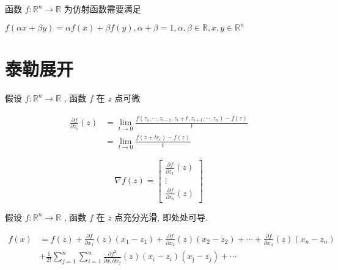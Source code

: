 \begin{theorem}
    函数 $ f: \mathbb{R}^{n} \rightarrow \mathbb{R} $ 为仿射函数需要满足

$ f(\alpha x+\beta y)=\alpha f(x)+\beta f(y), \alpha+\beta=1, \alpha, \beta \in \mathbb{R}, x, y \in \mathbb{R}^{n} $
\end{theorem}

\section{泰勒展开}

\begin{definition}[函数$f$第$i$个分量的一阶偏导数]
    假设 $ f: \mathbb{R}^{n} \rightarrow \mathbb{R} $ , 函数 $ f $ 在 $ z $ 点可微

    $$ \begin{aligned} \frac{\partial f}{\partial z_{i}}(z) &=\lim _{t \rightarrow 0} \frac{f\left(z_{1}, \cdots, z_{i-1}, z_{i}+t, z_{i+1}, \cdots, z_{n}\right)-f(z)}{t} \\ &=\lim _{t \rightarrow 0} \frac{f\left(z+t e_{i}\right)-f(z)}{t} \end{aligned} $$
\end{definition}

\begin{definition}[$f$在点$z$的梯度]
    $$ \nabla f(z)=\left[\begin{array}{c}\frac{\partial f}{\partial z_{1}}(z) \\ \vdots \\ \frac{\partial f}{\partial z_{n}}(z)\end{array}\right] $$
\end{definition}

\begin{definition}
    假设 $ f: \mathbb{R}^{n} \rightarrow \mathbb{R} $ , 函数 $ f $ 在 $ z $ 点充分光滑, 即处处可导.

    $$\begin{aligned} f(x)&=f(z)+\frac{\partial f}{\partial x_{1}}(z)\left(x_{1}-z_{1}\right)+\frac{\partial f}{\partial x_{2}}(z)\left(x_{2}-z_{2}\right)+\cdots+\frac{\partial f}{\partial x_{n}}(z)\left(x_{n}-z_{n}\right) 
    \\ & +\frac{1}{2 !} \sum_{j=1}^{n} \sum_{i=1}^{n} \frac{\partial f^{2}}{\partial x_{i} \partial x_{j}}(z)\left(x_{i}-z_{i}\right)\left(x_{\mathrm{j}}-z_{j}\right)+\cdots \end{aligned}$$
\end{definition}


